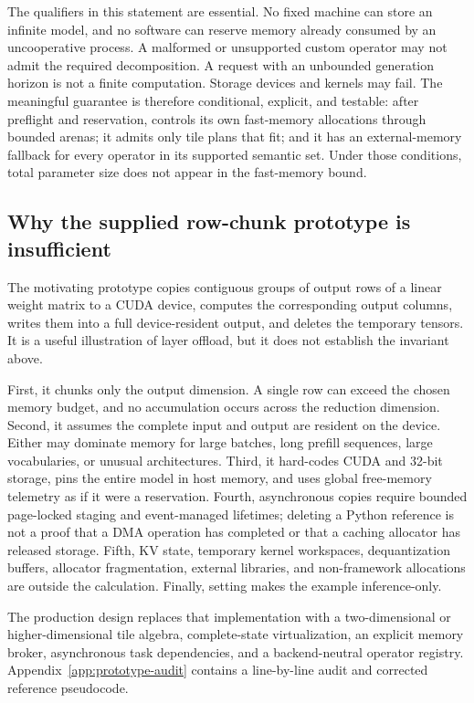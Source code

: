 The qualifiers in this statement are essential. No fixed machine can store an infinite model, and no software can reserve memory already consumed by an uncooperative process. A malformed or unsupported custom operator may not admit the required decomposition. A request with an unbounded generation horizon is not a finite computation. Storage devices and kernels may fail. The meaningful guarantee is therefore conditional, explicit, and testable: after preflight and reservation, \AMS controls its own fast-memory allocations through bounded arenas; it admits only tile plans that fit; and it has an external-memory fallback for every operator in its supported semantic set. Under those conditions, total parameter size does not appear in the fast-memory bound.

\subsection{Why the supplied row-chunk prototype is insufficient}

The motivating prototype copies contiguous groups of output rows of a linear weight matrix to a CUDA device, computes the corresponding output columns, writes them into a full device-resident output, and deletes the temporary tensors. It is a useful illustration of layer offload, but it does not establish the invariant above.

First, it chunks only the output dimension. A single row can exceed the chosen memory budget, and no accumulation occurs across the reduction dimension. Second, it assumes the complete input and output are resident on the device. Either may dominate memory for large batches, long prefill sequences, large vocabularies, or unusual architectures. Third, it hard-codes CUDA and 32-bit storage, pins the entire model in host memory, and uses global free-memory telemetry as if it were a reservation. Fourth, asynchronous copies require bounded page-locked staging and event-managed lifetimes; deleting a Python reference is not a proof that a DMA operation has completed or that a caching allocator has released storage. Fifth, KV state, temporary kernel workspaces, dequantization buffers, allocator fragmentation, external libraries, and non-framework allocations are outside the calculation. Finally, setting  makes the example inference-only.

The production design replaces that implementation with a two-dimensional or higher-dimensional tile algebra, complete-state virtualization, an explicit memory broker, asynchronous task dependencies, and a backend-neutral operator registry. Appendix~\ref{app:prototype-audit} contains a line-by-line audit and corrected reference pseudocode.

